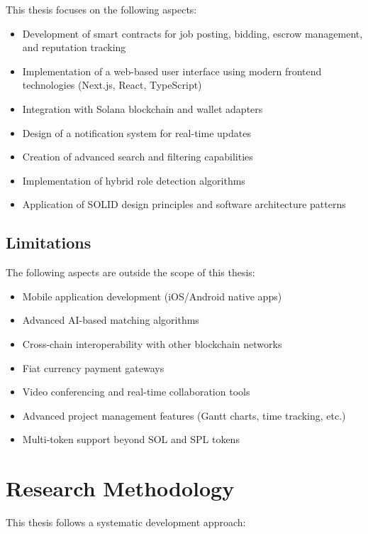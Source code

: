\documentclass[a4paper,13pt,twoside]{report}
\theoremstyle{definition}
\begin{document}
This thesis focuses on the following aspects:

\begin{itemize}
    \item Development of smart contracts for job posting, bidding, escrow management, and reputation tracking
    \item Implementation of a web-based user interface using modern frontend technologies (Next.js, React, TypeScript)
    \item Integration with Solana blockchain and wallet adapters
    \item Design of a notification system for real-time updates
    \item Creation of advanced search and filtering capabilities
    \item Implementation of hybrid role detection algorithms
    \item Application of SOLID design principles and software architecture patterns
\end{itemize}

\subsection{Limitations}

The following aspects are outside the scope of this thesis:

\begin{itemize}
    \item Mobile application development (iOS/Android native apps)
    \item Advanced AI-based matching algorithms
    \item Cross-chain interoperability with other blockchain networks
    \item Fiat currency payment gateways
    \item Video conferencing and real-time collaboration tools
    \item Advanced project management features (Gantt charts, time tracking, etc.)
    \item Multi-token support beyond SOL and SPL tokens
\end{itemize}

\section{Research Methodology}

This thesis follows a systematic development approach:
\end{document}
